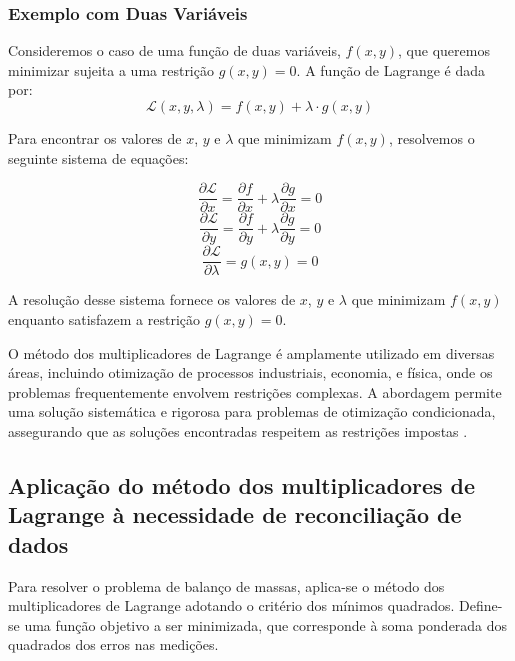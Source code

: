 \subsubsection{Exemplo com Duas Variáveis}

Consideremos o caso de uma função de duas variáveis, $f(x, y)$, que queremos minimizar sujeita a uma restrição $g(x, y) = 0$. A função de Lagrange é dada por:
\begin{equation}
	\mathcal{L}(x, y, \lambda) = f(x, y) + \lambda \cdot g(x, y)
	\label{eq:lagrange_two_variable}
\end{equation}

Para encontrar os valores de $x$, $y$ e $\lambda$ que minimizam $f(x, y)$, resolvemos o seguinte sistema de equações:

\begin{equation}
	\frac{\partial \mathcal{L}}{\partial x} = \frac{\partial f}{\partial x} + \lambda \frac{\partial g}{\partial x} = 0
	\label{eq:partial_x}
\end{equation}
\begin{equation}
	\frac{\partial \mathcal{L}}{\partial y} = \frac{\partial f}{\partial y} + \lambda \frac{\partial g}{\partial y} = 0
	\label{eq:partial_y}
\end{equation}
\begin{equation}
	\frac{\partial \mathcal{L}}{\partial \lambda} = g(x, y) = 0
	\label{eq:partial_lambda}
\end{equation}

A resolução desse sistema fornece os valores de $x$, $y$ e $\lambda$ que minimizam $f(x, y)$ enquanto satisfazem a restrição $g(x, y) = 0$.

O método dos multiplicadores de Lagrange é amplamente utilizado em diversas áreas, incluindo otimização de processos industriais, economia, e física, onde os problemas frequentemente envolvem restrições complexas. A abordagem permite uma solução sistemática e rigorosa para problemas de otimização condicionada, assegurando que as soluções encontradas respeitem as restrições impostas \cite{lagrangeoptbook}.

\subsection{Aplicação do método dos multiplicadores de Lagrange à necessidade de reconciliação de dados}

Para resolver o problema de balanço de massas, aplica-se o método dos multiplicadores de Lagrange adotando o critério dos mínimos quadrados. Define-se uma função objetivo a ser minimizada, que corresponde à soma ponderada dos quadrados dos erros nas medições.

